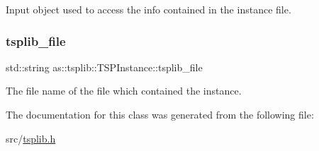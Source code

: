 Input object used to access the info contained in the instance file. 

\mbox{\label{classas_1_1tsplib_1_1TSPInstance_a6b2d4d7ad5e12825ceee49d32cdc28af}} 
\subsubsection{\texorpdfstring{tsplib\+\_\+file}{tsplib\_file}}
{\footnotesize\ttfamily std\+::string as\+::tsplib\+::\+T\+S\+P\+Instance\+::tsplib\+\_\+file\hspace{0.3cm}{\ttfamily [protected]}}



The file name of the file which contained the instance. 



The documentation for this class was generated from the following file\+:\begin{DoxyCompactItemize}
\item 
src/\hyperlink{tsplib_8h}{tsplib.\+h}\end{DoxyCompactItemize}
